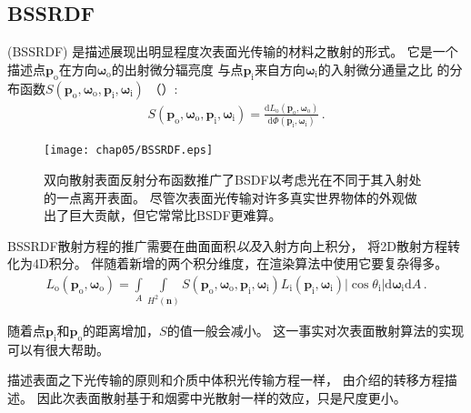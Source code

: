 \subsection{BSSRDF}\label{sub:BSSRDF}
(BSSRDF)
是描述展现出明显程度次表面光传输的材料之散射的形式。
它是一个描述点${\bm p}_{\mathrm{o}}$在方向${\bm\omega}_{\mathrm{o}}$的出射微分辐亮度
与点${\bm p}_{\mathrm{i}}$来自方向${\bm\omega}_{\mathrm{i}}$的入射微分通量之比
的分布函数$S({\bm p}_{\mathrm{o}},{\bm\omega}_{\mathrm{o}},{\bm p}_{\mathrm{i}},{\bm\omega}_{\mathrm{i}})$
（）:
\begin{align}\label{eq:5.10}
    S({\bm p}_{\mathrm{o}},{\bm\omega}_{\mathrm{o}},{\bm p}_{\mathrm{i}},{\bm\omega}_{\mathrm{i}})=\frac{\mathrm{d}L_{\mathrm{o}}({\bm p}_{\mathrm{o}},{\bm\omega}_{\mathrm{o}})}{\mathrm{d}\varPhi({\bm p}_{\mathrm{i}},{\bm\omega}_{\mathrm{i}})}\, .
\end{align}
\begin{figure}[htbp]
    \centering\texttt{[image: chap05/BSSRDF.eps]}
    \caption{双向散射表面反射分布函数推广了BSDF以考虑光在不同于其入射处的一点离开表面。
        尽管次表面光传输对许多真实世界物体的外观做出了巨大贡献，但它常常比BSDF更难算。}
    \label{fig:5.19}
\end{figure}

BSSRDF散射方程的推广需要在曲面面积\emph{以及}入射方向上积分，
将2D散射方程转化为4D积分。
伴随着新增的两个积分维度，在渲染算法中使用它要复杂得多。
\begin{align}\label{eq:5.11}
    L_{\mathrm{o}}({\bm p}_{\mathrm{o}},{\bm\omega}_{\mathrm{o}})=\int\limits_A\int\limits_{H^2({\bm n})}S({\bm p}_{\mathrm{o}},{\bm\omega}_{\mathrm{o}},{\bm p}_{\mathrm{i}},{\bm\omega}_{\mathrm{i}})L_{\mathrm{i}}({\bm p}_{\mathrm{i}},{\bm\omega}_{\mathrm{i}})|\cos\theta_{\mathrm{i}}|\mathrm{d}{\bm\omega}_{\mathrm{i}}\mathrm{d}A\, .
\end{align}

随着点${\bm p}_{\mathrm{i}}$和${\bm p}_{\mathrm{o}}$的距离增加，$S$的值一般会减小。
这一事实对次表面散射算法的实现可以有很大帮助。

描述表面之下光传输的原则和介质中体积光传输方程一样，
由介绍的转移方程描述。
因此次表面散射基于和烟雾中光散射一样的效应，只是尺度更小。